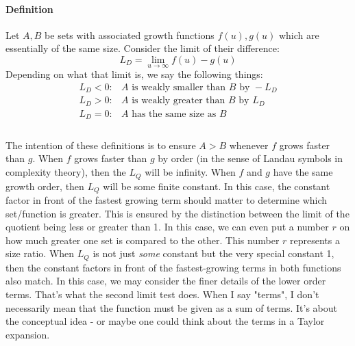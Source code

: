 \documentclass[12pt]{article}
\begin{document}
\paragraph{Definition}
Let $A,B$ be sets with associated growth functions $f(u), g(u)$ which are essentially of the same size. Consider the limit of their difference:
\begin{equation}
	L_D = \lim_{u \rightarrow \infty} f(u) - g(u)
\end{equation}
Depending on what that limit is, we say the following things:
\begin{eqnarray}
  L_D < 0:  &  A \text{ is weakly smaller than } B \text{ by } -L_D \\
  L_D > 0:  &  A \text{ is weakly greater than } B \text{ by }  L_D \\
  L_D = 0:  &  A \text{ has the same size as } B \\  
\end{eqnarray}


\paragraph{}
The intention of these definitions is to ensure $A > B$ whenever $f$ grows faster than $g$. When $f$ grows faster than $g$ by order (in the sense of Landau symbols in complexity theory), then the $L_Q$ will be infinity. When $f$ and $g$ have the same growth order, then $L_Q$ will be some finite constant. In this case, the constant factor in front of the fastest growing term should matter to determine which set/function is greater. This is ensured by the distinction between the limit of the quotient being less or greater than 1. In this case, we can even put a number $r$ on how much greater one set is compared to the other. This number $r$ represents a size ratio.  When $L_Q$ is not just \emph{some} constant but the very special constant 1, then the constant factors in front of the fastest-growing terms in both functions also match. In this case, we may consider the finer details of the lower order terms. That's what the second limit test does. When I say "terms", I don't necessarily mean that the function must be given as a sum of terms. It's about the conceptual idea - or maybe one could think about the terms in a Taylor expansion. 
\end{document}
